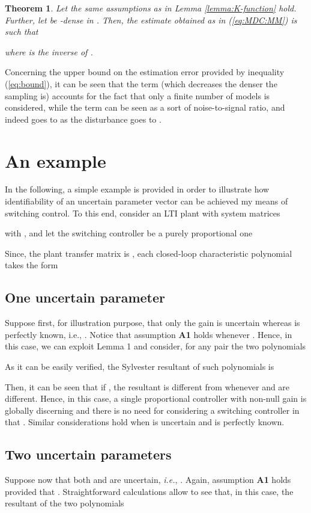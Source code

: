\documentclass[letterpaper, 10 pt, conference]{ieeetran}
\def\qedp{\hspace*{\fill}~{\tiny }}
\newtheorem{theorem}{Theorem}
\begin{document}
\begin{theorem}
Let the same assumptions as in Lemma \ref{lemma:K-function} hold. Further, let  be -dense in . Then, the estimate  obtained as in
(\ref{eq:MDC:MM}) is such that

where  is the inverse of . \qedp
\end{theorem} 

Concerning the upper bound on the estimation error provided by inequality (\ref{eq:bound}), it can be seen that  the term  
(which decreases the denser the sampling  is) accounts
for the fact that only a finite number of models is considered, while the term
 can be seen as a sort of noise-to-signal ratio, and indeed goes to  as the disturbance  goes to . 

\section{An example}


In the following, a simple example is provided in order to illustrate how identifiability of an uncertain parameter vector
can be achieved my means of switching control. To this end, consider an LTI plant with system matrices

with , and let the switching controller be a purely proportional one
 
Since, the plant transfer matrix is , each closed-loop characteristic polynomial takes the form


\subsection{One uncertain parameter} 

Suppose first, for illustration purpose, that only the gain  is uncertain whereas
 is perfectly known, i.e., . Notice that assumption \textbf{A1} holds whenever . Hence, in this case, we can exploit Lemma 1 and consider, for any pair  the two polynomials

As it can be easily verified, the Sylvester resultant of such polynomials is

Then, it can be seen that if , the resultant is different from  whenever  and  are different.  Hence, in this
case, a single proportional controller with non-null gain is globally discerning and there is no need for
considering a switching controller in that . Similar considerations hold when  is uncertain
and  is perfectly known.

\subsection{Two uncertain parameters} 
Suppose now that both  and  are uncertain, \emph{i.e.},
. Again, assumption \textbf{A1} holds provided that . Straightforward calculations allow to see that, in this case, the resultant of the two polynomials
 
\end{document}
